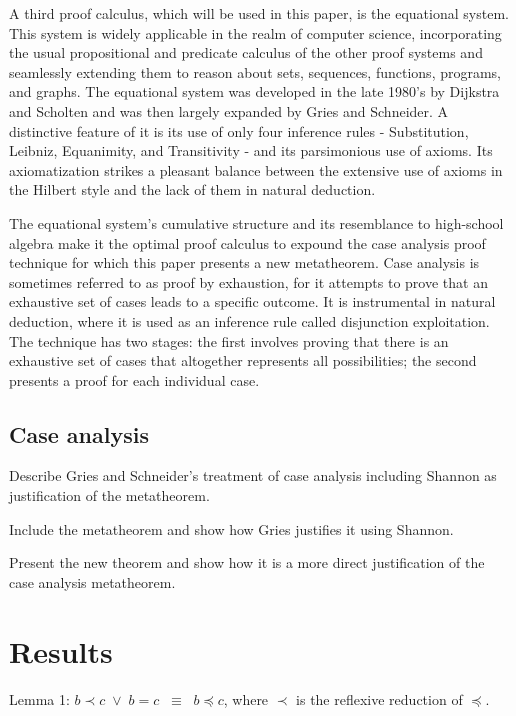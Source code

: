 \documentclass[12pt, fleqn, leqno]{article}
\newcommand{\equivss}{\ensuremath{\;\;\equiv\;\;}}  %
\newcommand{\lors}{\ensuremath{\;\lor\;}}           %
\begin{document}
A third proof calculus, which will be used in this paper, is the equational system. This system is widely applicable in the realm of computer science, incorporating the usual propositional and predicate calculus of the other proof systems and seamlessly extending them to reason about sets, sequences, functions, programs, and graphs. The equational system was developed in the late 1980’s by Dijkstra and Scholten and was then largely expanded by Gries and Schneider. A distinctive feature of it is its use of only four inference rules - Substitution, Leibniz, Equanimity, and Transitivity - and its parsimonious use of axioms. Its axiomatization strikes a pleasant balance between the extensive use of axioms in the Hilbert style and the lack of them in natural deduction.

The equational system’s cumulative structure and its resemblance to high-school algebra make it the optimal proof calculus to expound the case analysis proof technique for which this paper presents a new metatheorem. Case analysis is sometimes referred to as proof by exhaustion, for it attempts to prove that an exhaustive set of cases leads to a specific outcome. It is instrumental in natural deduction, where it is used as an inference rule called disjunction exploitation. The technique has two stages: the first involves proving that there is an exhaustive set of cases that altogether represents all possibilities; the second presents a proof for each individual case.

\subsection{Case analysis}

Describe Gries and Schneider's treatment of case analysis including Shannon as justification of the metatheorem.

Include the metatheorem and show how Gries justifies it using Shannon. 

Present the new theorem and show how it is a more direct justification of the case analysis metatheorem.

\section{Results}

Lemma 1: $b \prec c \lors b = c \equivss b \preceq c$, where $\prec$ is the reflexive reduction of $\preceq$.
\end{document}
